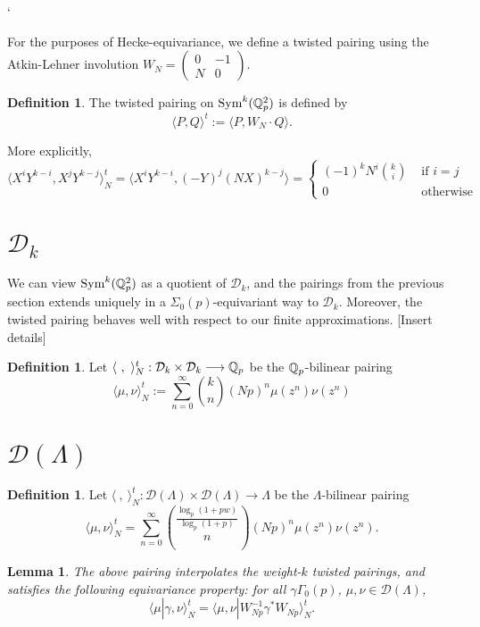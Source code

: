 `\documentclass[12pt]{article}
\newtheorem{lem}[thm]{Lemma}
\theoremstyle{definition}
\newtheorem{defn}[thm]{Definition}
\def\cD{{\mathcal D}}
\def\Q{{\Bbb Q}}
\def\Sym{\operatorname{Sym}}
\begin{document}
For the purposes of Hecke-equivariance, we define a twisted pairing using the Atkin-Lehner involution $W_N = \begin{pmatrix} 0 & -1 \\ N & 0 \end{pmatrix}$.
\begin{defn}
The twisted pairing on $\Sym^k(\Q_p^2)$ is defined by
\begin{equation}
	\langle P, Q\rangle^t := \langle P, W_N \cdot Q\rangle.
\end{equation}
\end{defn}
More explicitly,
\begin{equation*}
	\langle X^iY^{k-i}, X^j Y^{k-j} \rangle_N^t = \langle X^i Y^{k-i}, (-Y)^j(NX)^{k-j}\rangle= \begin{cases} (-1)^k N^i {k \choose i} & \text{ if } i=j\\
												0	& \text{ otherwise} \end{cases}
\end{equation*}


\section{$\cD_k$}
We can view $\Sym^k(\Q_p^2)$ as a quotient of $\cD_k$, and the pairings from the previous section extends uniquely in a $\Sigma_0(p)$-equivariant way to $\cD_k$. Moreover, the twisted pairing behaves well with respect to our finite approximations. [Insert details]

\begin{defn}
Let $\langle~,~\rangle^t_N : \cD_k\times\cD_k\longrightarrow \Q_p$ be the $\Q_p$-bilinear pairing
\begin{equation}
	\langle \mu, \nu \rangle_N^t := \sum_{n=0}^\infty {k \choose n} (Np)^n \mu(z^n)\nu(z^n)
\end{equation}
\end{defn}


\section{$\cD(\Lambda)$}

\begin{defn}
Let $\langle ~, ~\rangle^t_N :\cD(\Lambda)\times\cD(\Lambda) \longrightarrow \Lambda$ be the $\Lambda$-bilinear pairing
\begin{equation}
	\langle \mu, \nu \rangle_N^t = \sum_{n=0}^\infty {\frac{\log_p(1+pw)}{\log_p(1+p)} \choose n} (Np)^n \mu(z^n)\nu(z^n).
\end{equation}
\end{defn}

\begin{lem}
The above pairing interpolates the weight-$k$ twisted pairings, and satisfies the following equivariance property: for all $\gamma \Gamma_0(p)$, $\mu,\nu\in \cD(\Lambda)$, 
\begin{equation}
	\langle \mu | \gamma, \nu\rangle_N^t  = \langle \mu, \nu| W_{Np}^{-1}\gamma^* W_{Np}\rangle_N^t.
\end{equation}	
\end{lem}
\end{document}
